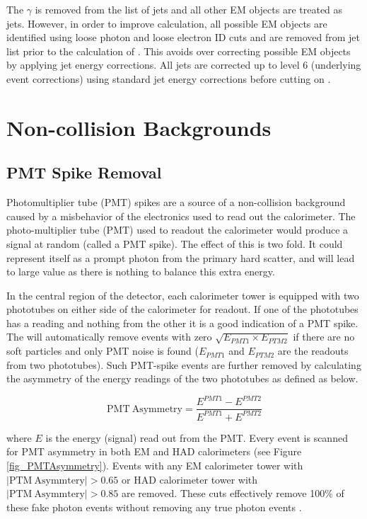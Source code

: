 \documentclass[11pt]{article}
\begin{document}
 The $\gamma$ is removed from the list of jets and all other EM objects are treated as jets. However, in order to improve \met calculation, all possible EM objects are identified using loose photon and loose electron ID cuts and are removed from jet list prior to the calculation of \metCorr. This avoids over correcting possible EM objects by applying jet energy corrections. All jets are corrected up to level 6 (underlying event corrections) using standard jet energy corrections \cite{wwwJER} before cutting on \et.


\section{Non-collision Backgrounds}\label{noncollision_backgrounds}

\subsection{PMT Spike Removal}\label{pmtspikes}
Photomultiplier tube (PMT) spikes are a source of a non-collision background caused by a misbehavior of the electronics used to read out the calorimeter. The photo-multiplier tube (PMT) used to readout the calorimeter would produce a signal at random (called a PMT spike). The effect of this is two fold. It could represent itself as a prompt photon from the primary hard scatter, and will lead to large \met value as there is nothing to balance this extra energy.

In the central region of the detector, each calorimeter tower is equipped with two phototubes on either side of the calorimeter for readout. If one of the phototubes has a reading and nothing from the other it is a good indication of a PMT spike. The  will automatically remove events with zero $\sqrt{E_{PMT1}\times E_{PTM2}}$ if there are no soft particles and only PMT noise is found ($E_{PMT1}$ and $E_{PTM2}$ are the readouts from two phototubes). Such PMT-spike events are further removed by calculating the asymmetry of the energy readings of the two phototubes as defined as below.

\begin{equation}
 \mathrm{PMT~Asymmetry} = \frac{E^{PMT1} - E^{PMT2}}{E^{PMT1} + E^{PMT2}}
\label{eqa_PMTAsymmetry}
 \end{equation}

 \noindent where $E$ is the energy (signal) read out from the PMT. Every event is scanned for PMT asymmetry in both EM and HAD calorimeters (see Figure \ref{fig_PMTAsymmetry}). Events with any EM calorimeter tower with $\mathrm{|PTM~Asymmtery}| > 0.65$ or HAD calorimeter tower with $\mathrm{|PTM~Asymmtery}| > 0.85$ \cite{cdfnote:9184} are removed. These cuts effectively remove 100\% of these fake photon events without removing any true photon events \cite{cdfnote:7960}.
\end{document}
